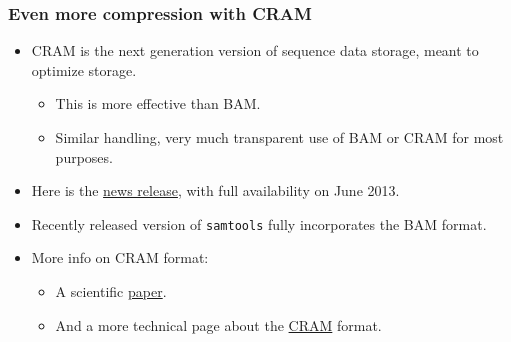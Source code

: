 \documentclass{beamer}
\begin{document}
\begin{frame}
  \frametitle{Even more compression with CRAM}
  \begin{itemize}
  \item CRAM is the next generation version of sequence data storage, meant to optimize storage.
    \begin{itemize}
    \item This is more effective than BAM.
    \item Similar handling, very much transparent use of BAM or CRAM for most purposes.
    \end{itemize}
  \item Here is the \href{http://www.ebi.ac.uk/about/news/service-news/cram-pre-launch}{news release}, with full availability on June 2013.
  \item Recently released version of \texttt{samtools} fully incorporates the BAM format.
  \item More info on CRAM format:
    \begin{itemize}
    \item A scientific \href{http://genome.cshlp.org/content/21/5/734}{paper}.
    \item And a more technical page about the \href{http://www.ebi.ac.uk/ena/about/cram_toolkit}{CRAM} format.
    \end{itemize}
  \end{itemize}
\end{frame}
\end{document}
